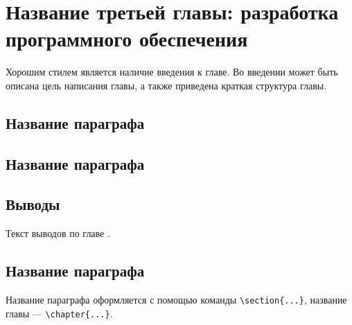 \chapter{Название третьей главы: разработка программного обеспечения} \label{ch3}


Хорошим стилем является наличие введения к главе. Во введении может быть описана цель написания главы, а также приведена краткая структура главы. 
	
\section{Название параграфа} \label{ch3:sec1}

\section{Название параграфа} \label{ch3:sec2}



\section{Выводы} \label{ch3:conclusion}

Текст выводов по главе \thechapter.
\section{Название параграфа} \label{ch2:sec-abbr} %

Название параграфа оформляется с помощью команды \verb|\section{...}|, название главы --- \verb|\chapter{...}|. 